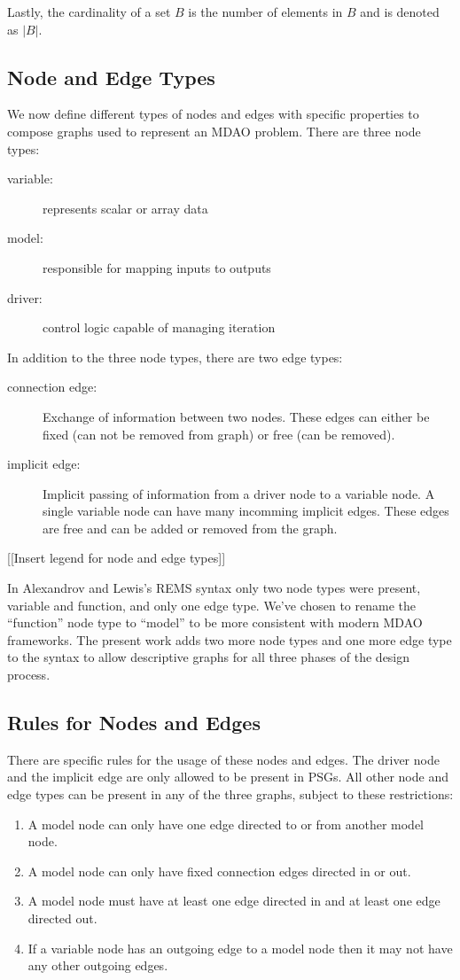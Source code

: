 	Lastly, the cardinality of a set $B$ is the number of elements in $B$ and is denoted as $|B|$.

\subsection{Node and Edge Types}
	\label{ss:types}
	We now define different types of nodes and edges with specific properties to compose graphs used to represent an MDAO problem. 
	There are three node types:  
	\begin{description}
	\item[variable: ] represents scalar or array data
	\item[model:] responsible for mapping inputs to outputs
	\item[driver:] control logic capable of managing iteration
	\end{description}

	In addition to the three node types, there are two edge types: 

	\begin{description}
	\item[connection edge:] Exchange of information between two nodes. These edges 
	can either be fixed (can not be removed from graph) or free (can be removed). 
	\item [implicit edge:] Implicit passing of information from a driver node to a 
	  variable node. A single variable node can have many incomming implicit edges. These edges are 
	  free and can be added or removed from the graph. 
	\end{description}

	[[Insert legend for node and edge types]]

	In Alexandrov and Lewis's REMS syntax only two node types were present, variable 
	and function, and only one edge type\cite{alexandrov2004}. We've chosen to rename the ``function'' node 
	type to ``model'' to be more consistent with modern MDAO frameworks. The present work 
	adds two more node types and one more edge type to the syntax to allow descriptive
	graphs for all three phases of the design process. 

\subsection{Rules for Nodes and Edges}
	\label{ss:rules}
	There are specific rules for the usage of these nodes and edges.
	The driver node and the implicit edge are only allowed to be present in PSGs. All 
	other node and edge types can be present in any of the three graphs, subject to these restrictions: 
	\begin{enumerate}
	\item A model node can only have one edge directed to or from another model node.
	\item A model node can only have fixed connection edges directed in or out.
	\item A model node must have at least one edge directed in and at least one edge 
	  directed out.
	\item If a variable node has an outgoing edge to a model node then it may not have 
	  any other outgoing edges.
	\end{enumerate}


